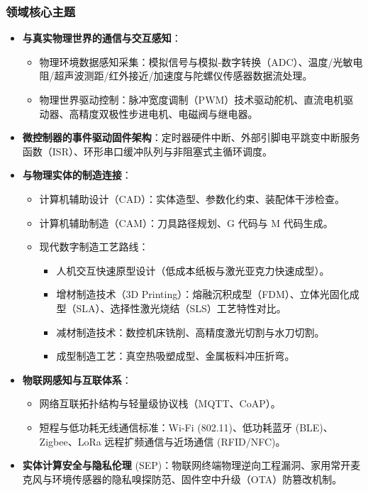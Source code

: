 \subsubsection{领域核心主题}
\begin{itemize}
    \item \textbf{与真实物理世界的通信与交互感知}：
    \begin{itemize}
        \item 物理环境数据感知采集：模拟信号与模拟-数字转换（ADC）、温度/光敏电阻/超声波测距/红外接近/加速度与陀螺仪传感器数据流处理。
        \item 物理世界驱动控制：脉冲宽度调制（PWM）技术驱动舵机、直流电机驱动器、高精度双极性步进电机、电磁阀与继电器。
    \end{itemize}
    \item \textbf{微控制器的事件驱动固件架构}：定时器硬件中断、外部引脚电平跳变中断服务函数（ISR）、环形串口缓冲队列与非阻塞式主循环调度。
    \item \textbf{与物理实体的制造连接}：
    \begin{itemize}
        \item 计算机辅助设计（CAD）：实体造型、参数化约束、装配体干涉检查。
        \item 计算机辅助制造（CAM）：刀具路径规划、G 代码与 M 代码生成。
        \item 现代数字制造工艺路线：
        \begin{itemize}
            \item 人机交互快速原型设计（低成本纸板与激光亚克力快速成型）。
            \item 增材制造技术（3D Printing）：熔融沉积成型（FDM）、立体光固化成型（SLA）、选择性激光烧结（SLS）工艺特性对比。
            \item 减材制造技术：数控机床铣削、高精度激光切割与水刀切割。
            \item 成型制造工艺：真空热吸塑成型、金属板料冲压折弯。
        \end{itemize}
    \end{itemize}
    \item \textbf{物联网感知与互联体系}：
    \begin{itemize}
        \item 网络互联拓扑结构与轻量级协议栈（MQTT、CoAP）。
        \item 短程与低功耗无线通信标准：Wi-Fi (802.11)、低功耗蓝牙 (BLE)、Zigbee、LoRa 远程扩频通信与近场通信 (RFID/NFC)。
    \end{itemize}
    \item \textbf{实体计算安全与隐私伦理} (SEP)：物联网终端物理逆向工程漏洞、家用常开麦克风与环境传感器的隐私嗅探防范、固件空中升级（OTA）防篡改机制。
\end{itemize}

